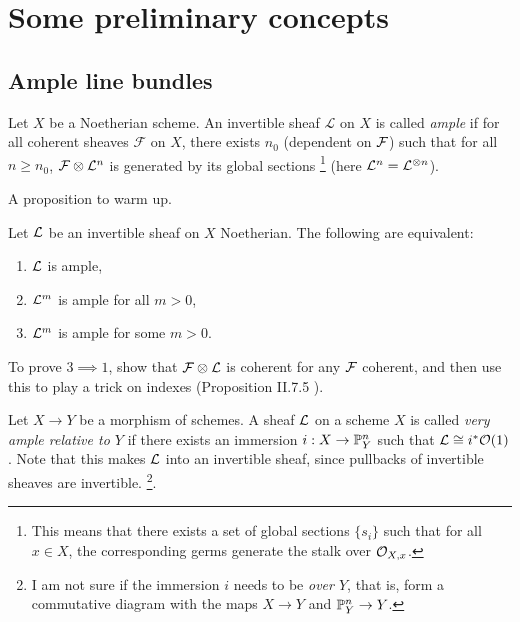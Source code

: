 \chapter{Some preliminary concepts}

\section{Ample line bundles}

\begin{definition}
	Let $X$ be a Noetherian scheme. An invertible sheaf $\mathcal{L}$ on $X$ is called \emph{ample} if for all coherent sheaves $\mathcal{F}$ on $X$, there exists $n_0$ (dependent on $\mathcal{F}$) such that for all $n \geq n_0$, $\mathcal{F} \otimes \mathcal{L}^n$ is generated by its global sections \footnote{This means that there exists a set of global sections $\{s_i\}$ such that for all $x \in X$, the corresponding germs generate the stalk over $\mathcal{O}_{X,x}$.} (here $\mathcal{L}^n = \mathcal{L}^{\otimes n}$).
\end{definition}

A proposition to warm up.
\begin{proposition} Let $\mathcal{L}$ be an invertible sheaf on $X$ Noetherian.
	The following are equivalent: \begin{enumerate}
    	\item $\mathcal{L}$ is ample,
		\item $\mathcal{L}^m$ is ample for all $m > 0$,
		\item $\mathcal{L}^m$ is ample for some $m > 0$.
    \end{enumerate}
\end{proposition}

To prove $3 \implies 1$, show that $\mathcal{F} \otimes \mathcal{L}$ is coherent for any $\mathcal{F}$ coherent, and then use this to play a trick on indexes (Proposition II.7.5 \cite{hartshorne2013algebraic}).

\begin{definition}\label{def:very-ample}
	Let $X \to Y$ be a morphism of schemes. A sheaf $\mathcal{L}$ on a scheme $X$ is called \emph{very ample relative to $Y$} if there exists an immersion $i: X \to \mathbb{P}^n_Y$ such that $\mathcal{L} \cong i^* \mathcal{O}(1)$. Note that this makes $\mathcal{L}$ into an invertible sheaf, since pullbacks of invertible sheaves are invertible. \footnote{I am not sure if the immersion $i$ needs to be \emph{over $Y$}, that is, form a commutative diagram with the maps $X \to Y$ and $\mathbb{P}^n_Y \to Y$.}. 
\end{definition}

